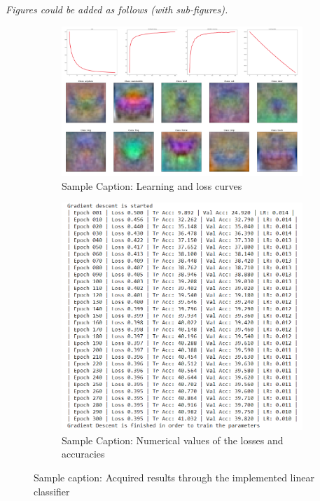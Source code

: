 \documentclass[11pt]{scrartcl}
\begin{document}
{\begin{enumerate}[label=(\alph*)]
\textit{Figures could be added as follows (with sub-figures).}
\begin{figure}[H]
\centering
\begin{subfigure}{.5\textwidth}
  \centering
  \includegraphics[width=0.9\linewidth]{1_2.PNG}
  \caption{Sample Caption: Learning and loss curves}
  \label{fig:sub1}
\end{subfigure}%
\begin{subfigure}{0.5\textwidth}
  \centering
  \includegraphics[width=0.7\linewidth]{1_1.PNG}
  \caption{Sample Caption: Numerical values of the losses and accuracies}
  \label{fig:sub2}
\end{subfigure}
\caption{Sample caption: Acquired results through the implemented linear classifier}
\label{fig:test}
\end{figure}
\end{enumerate}

}
\end{document}
